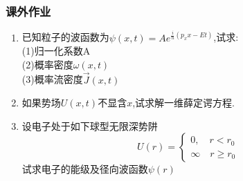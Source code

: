 \begin{frame}
    \frametitle{课外作业}
    \begin{enumerate}
        \item 已知粒子的波函数为$\psi(x,t)=Ae^{\frac{i}{\hbar}(p_x x - E t)}$,试求:\\
                (1)归一化系数A\\
                (2)概率密度$\omega(x,t)$\\
                (3)概率流密度$\vec{J}(x,t)$
        \item 如果势场$U(x,t)$不显含$x$,试求解一维薛定谔方程. 
        \item 设电子处于如下球型无限深势阱
        \[ U(r)= \begin{cases}
            0, \quad r<r_0 \\
            \infty \quad r\geq r_0
        \end{cases} 
        \]
        试求电子的能级及径向波函数$\psi(r)$
    \end{enumerate}
\end{frame}

